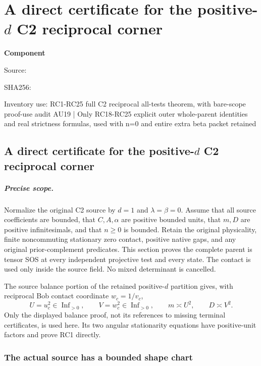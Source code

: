 \chapter{A direct certificate for the positive-$d$ C2 reciprocal corner}
\label{component:p10686597065a}
\noindent\textbf{Component }\par
{\small\noindent Source: \par}
{\small\noindent SHA256: \par}
{\small\noindent Inventory use: RC1-RC25 full C2 reciprocal all-tests theorem, with bare-scope proof-use audit AU19 | Only RC18-RC25 explicit outer whole-parent identities and real strictness formulas, used with n=0 and entire extra beta packet retained\par}
\medskip
\section{A direct certificate for the positive-$d$ C2 reciprocal corner}
\label{p10686597065a:sec:new-rc-direct}

\paragraph{Precise scope.}
Normalize the original C2 source by $d=1$ and $\lambda=\beta=0$.
Assume that all source coefficients are bounded, that $C,A,\alpha$
are positive bounded units, that $m,D$ are positive infinitesimals,
and that $n\geq0$ is bounded. Retain the original physicality,
finite noncommuting stationary zero contact, positive native gaps,
and any original prior-complement predicates. This section proves
the complete parent is tensor SOS at every independent projective
test and every state. The contact is used only inside the source
field. No mixed determinant is cancelled.

The source balance portion of the retained positive-$d$ partition
gives, with reciprocal Bob contact coordinate $w_c=1/v_c$,
\[
 U=u_c^2\in\operatorname{Inf}_{>0},\qquad
 V=w_c^2\in\operatorname{Inf}_{>0},\qquad
 m\asymp U^2,\qquad D\asymp V^2.
 \tag{RC1}
\]
Only the displayed balance proof, not its references to missing
terminal certificates, is used here. Its two angular stationarity
equations have positive-unit factors and prove RC1 directly.

\subsection{The actual source has a bounded shape chart}

